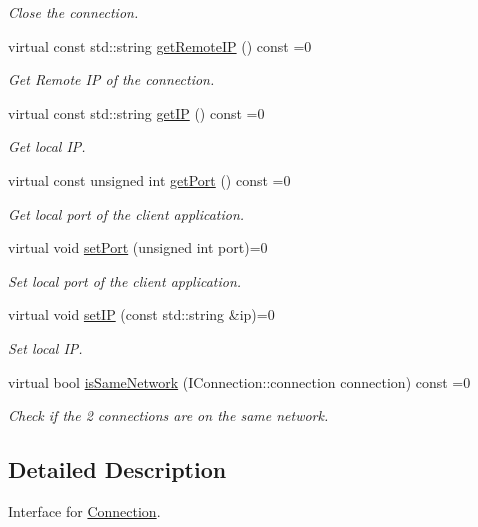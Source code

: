 \begin{DoxyCompactItemize}
\begin{DoxyCompactList}\small\item\em Close the connection. \end{DoxyCompactList}\item 
virtual const std\-::string \hyperlink{class_i_connection_aed73351e687ee739fd3faf2e0fa7ef3a}{get\-Remote\-I\-P} () const =0
\begin{DoxyCompactList}\small\item\em Get Remote I\-P of the connection. \end{DoxyCompactList}\item 
virtual const std\-::string \hyperlink{class_i_connection_a33942193b20aa6e1635d8790036dbab8}{get\-I\-P} () const =0
\begin{DoxyCompactList}\small\item\em Get local I\-P. \end{DoxyCompactList}\item 
virtual const unsigned int \hyperlink{class_i_connection_ac7f0924463f269ce358b633f588ed69e}{get\-Port} () const =0
\begin{DoxyCompactList}\small\item\em Get local port of the client application. \end{DoxyCompactList}\item 
virtual void \hyperlink{class_i_connection_a4b9c53bb9296c2ba5e1bf15003cf5f12}{set\-Port} (unsigned int port)=0
\begin{DoxyCompactList}\small\item\em Set local port of the client application. \end{DoxyCompactList}\item 
virtual void \hyperlink{class_i_connection_a0db0e651a8c588b6f97f168ddb6a49c7}{set\-I\-P} (const std\-::string \&ip)=0
\begin{DoxyCompactList}\small\item\em Set local I\-P. \end{DoxyCompactList}\item 
virtual bool \hyperlink{class_i_connection_a76c7eac153c78fc105e7f721aad83c19}{is\-Same\-Network} (I\-Connection\-::connection connection) const =0
\begin{DoxyCompactList}\small\item\em Check if the 2 connections are on the same network. \end{DoxyCompactList}\end{DoxyCompactItemize}


\subsection{Detailed Description}
Interface for \hyperlink{class_connection}{Connection}. 

